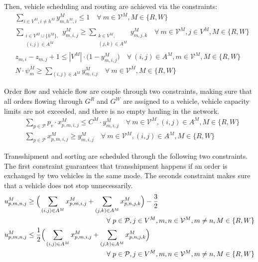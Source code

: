 \documentclass[12pt]{article}
\numberwithin{equation}{section}
\begin{document}
	Then, vehicle scheduling and routing are achieved via the constraints:
	\begin{align}
	&\sum_{i\in V^M, i\ne h^M}y^M_{m, h^M, i}\le1\quad\forall\ m\in \mathcal{V}^M, M\in \{R, W\}\label{eq:virtual_hub}\\
	&\sum_{\substack{i\in V^M\cup \{h^M\},\\(i, j)\in A^M}}y^M_{m, i, j}\ge\sum_{\substack{k\in V^M,\\(j, k)\in A^M}}y^M_{m, j, k}\quad\forall\ m\in \mathcal{V}^M, j\in V^M, M\in \{R, W\}\label{eq:vehicle_balance}\\
	&z_{m, i}-z_{m, j}+1\le |V^M|\cdot\big(1-y^M_{m, i, j}\big)\quad\forall\ (i, j)\in A^M, m\in \mathcal{V}^M, M\in \{R, W\}\label{eq:subtour_elimination}\\
	&N\cdot \psi^M_m\ge\sum_{(i, j)\in A^M}y^M_{m, i, j}\quad\forall\ m\in\mathcal{V}^M, M\in\{R, W\}\label{eq:vehicle_number}
	\end{align}
	
	Order flow and vehicle flow are couple through two constraints, making sure that all orders flowing through $G^R$ and $G^W$ are assigned to a vehicle, vehicle capacity limits are not exceeded, and there is no empty hauling in the network.
	\begin{align}
	&\sum_{p\in\mathcal{P}}p_v\cdot x^M_{p, m, i, j}\le C^M\cdot y^M_{m, i, j}\quad\forall\ m\in \mathcal{V}^M, (i, j)\in A^M, M\in\{R, W\}\label{eq:capacity}\\
	&\sum_{p\in\mathcal{P}}x^M_{p, m, i, j}\ge y^M_{m, i, j}\quad\forall\ m\in \mathcal{V}^M, (i, j)\in A^M, M\in\{R, W\}\label{eq:empty_haul}
	\end{align}
	
	Transshipment and sorting are scheduled through the following two constraints. The first constraint guarantees that transshipment happens if an order is exchanged by two vehicles in the same mode. The seconds constraint makes sure that a vehicle does not stop unnecessarily.
	\begin{align}
	&u^M_{p, m, n, j}\ge \Big( \sum_{(i, j)\in A^M}x^M_{p, m, i, j}+ \sum_{(j, k)\in A^M}x^M_{p, n, j, k}\Big)-\frac{3}{2}\notag\\
	&\text{\hspace{150pt}}\forall\ p\in \mathcal{P}, j\in V^M, m, n\in\mathcal{V}^M, m\ne n, M\in\{R, W\}\label{eq:transshipment}\\
	&u^M_{p, m, n, j}\le \frac{1}{2}\Big(\sum_{(i, j)\in A^M}x^M_{p, m, i, j}+ \sum_{(j, k)\in A^M}x^M_{p, n, j, k}\Big)\notag\\
	&\text{\hspace{150pt}}\forall\ p\in \mathcal{P}, j\in V^M, m, n\in\mathcal{V}^M, m\ne n, M\in\{R, W\}\label{eq:unnecessary_stop}
	\end{align}
	
\end{document}
